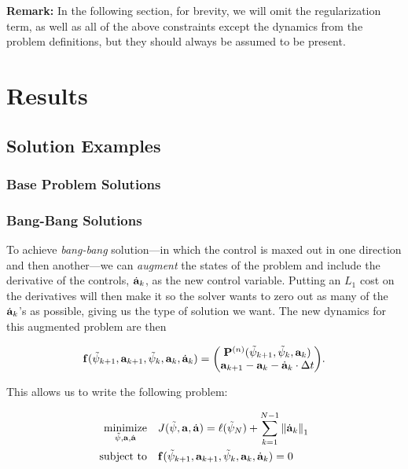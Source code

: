 \documentclass{article}
\newcommand{\isopsi}{\tilde \psi}
\newcommand{\minimize}[1]{\underset{#1}{\text{minimize}}}
\newcommand{\st}{\text{subject to}}
\begin{document}
\noindent
\textbf{Remark:} In the following section, for brevity, we will omit the regularization term, as well as all of the above constraints except the dynamics from the problem definitions, but they should always be assumed to be present.



\section{Results}

\subsection{Solution Examples}

\subsubsection*{Base Problem Solutions}

\subsubsection*{Bang-Bang Solutions}

To achieve \textit{bang-bang} solution---in which the control is maxed out in one direction and then another---we can \textit{augment} the states of the problem and include the derivative of the controls, $\dot{\vb{a}}_k$, as the new control variable.  Putting an $L_1$ cost on the derivatives will then make it so the solver wants to zero out as many of the $\dot{\vb{a}}_k$'s as possible, giving us the type of solution we want. The new dynamics for this augmented problem are then

\begin{equation}
  \vb{f}(\isopsi_{k+1}, \vb{a}_{k+1}, \isopsi_k, \vb{a}_k, \dot{\vb{a}}_k) = \mqty(\vb{P}^{(n)}(\isopsi_{k+1}, \isopsi_k, \vb{a}_k) \\ \vb{a}_{k+1} - \vb{a}_k - \dot{\vb{a}}_k \cdot \Delta t).
\end{equation}

\noindent
This allows us to write the following problem:

\begin{align}
  \minimize{\isopsi, \vb{a}, \dot{\vb{a}}} \quad & J(\isopsi, \vb{a}, \dot{\vb{a}}) = \ell(\isopsi_N) + \sum_{k=1}^{N-1} \norm{\dot{\vb{a}}_k}_1 \\
  \st \quad & \vb{f}(\isopsi_{k+1}, \vb{a}_{k+1}, \isopsi_k, \vb{a}_k, \dot{\vb{a}}_k) = 0
\end{align}
\end{document}

